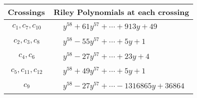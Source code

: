 \documentclass[1p]{elsarticle_modified}
\theoremstyle{definition}
\begin{document}
\begin{tabular}{m{50pt}|m{274pt}}
Crossings & \hspace{64pt}Riley Polynomials at each crossing \\
\hline $$\begin{aligned}c_{1},c_{7},c_{10}\end{aligned}$$&$\begin{aligned}
&y^{58}+61 y^{57}+\cdots+913 y+49
\end{aligned}$\\
\hline $$\begin{aligned}c_{2},c_{3},c_{8}\end{aligned}$$&$\begin{aligned}
&y^{58}-55 y^{57}+\cdots+5 y+1
\end{aligned}$\\
\hline $$\begin{aligned}c_{4},c_{6}\end{aligned}$$&$\begin{aligned}
&y^{58}-27 y^{57}+\cdots+23 y+4
\end{aligned}$\\
\hline $$\begin{aligned}c_{5},c_{11},c_{12}\end{aligned}$$&$\begin{aligned}
&y^{58}+49 y^{57}+\cdots+5 y+1
\end{aligned}$\\
\hline $$\begin{aligned}c_{9}\end{aligned}$$&$\begin{aligned}
&y^{58}-27 y^{57}+\cdots-1316865 y+36864
\end{aligned}$\\
\hline
\end{tabular}
\vskip 2pc
\end{document}
